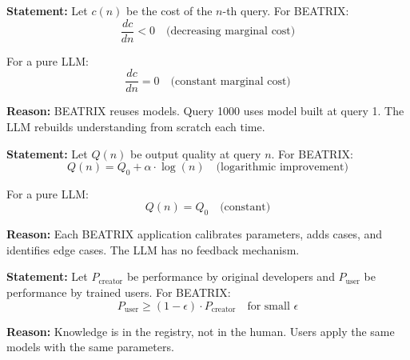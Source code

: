 \begin{tcolorbox}[colback=gray!5!white, colframe=gray!75!black,
    title=Axiom BX-5: Marginal Cost Reduction]
\textbf{Statement:} Let $c(n)$ be the cost of the $n$-th query. For BEATRIX:
\begin{equation}
\frac{dc}{dn} < 0 \quad \text{(decreasing marginal cost)}
\end{equation}

For a pure LLM:
\begin{equation}
\frac{dc}{dn} = 0 \quad \text{(constant marginal cost)}
\end{equation}

\textbf{Reason:} BEATRIX reuses models. Query 1000 uses model built at query 1. The LLM rebuilds understanding from scratch each time.
\end{tcolorbox}

\begin{tcolorbox}[colback=gray!5!white, colframe=gray!75!black,
    title=Axiom BX-6: Quality Improvement with N]
\textbf{Statement:} Let $Q(n)$ be output quality at query $n$. For BEATRIX:
\begin{equation}
Q(n) = Q_0 + \alpha \cdot \log(n) \quad \text{(logarithmic improvement)}
\end{equation}

For a pure LLM:
\begin{equation}
Q(n) = Q_0 \quad \text{(constant)}
\end{equation}

\textbf{Reason:} Each BEATRIX application calibrates parameters, adds cases, and identifies edge cases. The LLM has no feedback mechanism.
\end{tcolorbox}

\begin{tcolorbox}[colback=gray!5!white, colframe=gray!75!black,
    title=Axiom BX-7: Creator Independence]
\textbf{Statement:} Let $P_{\text{creator}}$ be performance by original developers and $P_{\text{user}}$ be performance by trained users. For BEATRIX:
\begin{equation}
P_{\text{user}} \geq (1 - \epsilon) \cdot P_{\text{creator}} \quad \text{for small } \epsilon
\end{equation}

\textbf{Reason:} Knowledge is in the registry, not in the human. Users apply the same models with the same parameters.
\end{tcolorbox}



